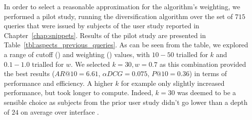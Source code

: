 In order to select a reasonable approximation for the algorithm's weighting, we performed a pilot study, running the diversification algorithm over the set of $715$ queries that were issued by subjects of the user study reported in Chapter~\ref{chap:snippets}. Results of the pilot study are presented in Table~\ref{tbl:aspects_previous_queries}. As can be seen from the table, we explored a range of cutoff () and weighting () values, with $10-50$ trialled for $k$ and $0.1-1.0$ trialled for $w$. We selected $k=30, w=0.7$ as this combination provided the best results ($AR@10=6.61$, $\alpha DCG=0.075$, $P@10=0.36$) in terms of performance and efficiency. A higher $k$ for example only slightly increased performance, but took longer to compute. Indeed, $k=30$ was deemed to be a sensible choice as subjects from the prior user study didn't go lower than a depth of $24$ on average over interface .


